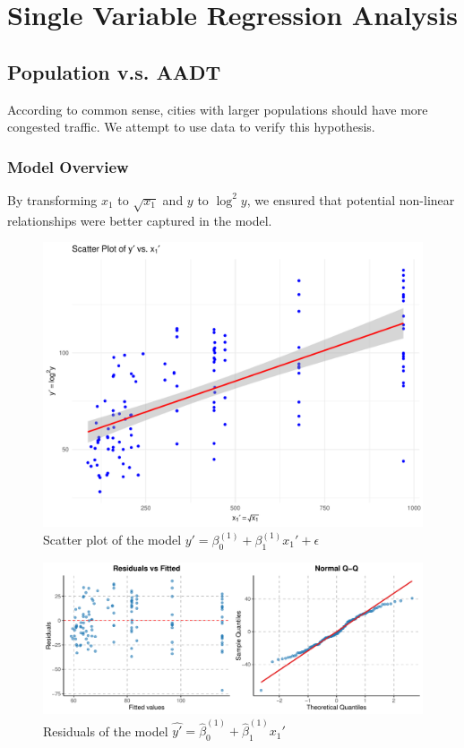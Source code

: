 \section{Single Variable Regression Analysis}


\subsection{Population v.s. AADT}

According to common sense, cities with larger populations should have more congested traffic. We attempt to use data to verify this hypothesis. 

\subsubsection{Model Overview}

By transforming \(x_1\) to \(\sqrt{x_1}\) and \(y\) to \(\log^2 y\), we ensured that potential non-linear relationships were better captured in the model.

\begin{figure}
    \centering
    \includegraphics[width=0.5\linewidth]{figures/x1/scatter_plot}
    \caption{Scatter plot of the model $y' = \beta_0^{(1)} +\beta_1^{(1)} x_1' + \epsilon$}
    \label{fig:x1_scatter}
\end{figure}

\begin{figure}
    \centering
    \includegraphics[width=1\linewidth]{figures/x1/residuals_vs_fitted_qqplot}
    \caption{Residuals of the model $\hat{y'} = \hat{\beta}_0^{(1)} +\hat{\beta}_1^{(1)} x_1'$}
    \label{fig:x1_res}
\end{figure}

